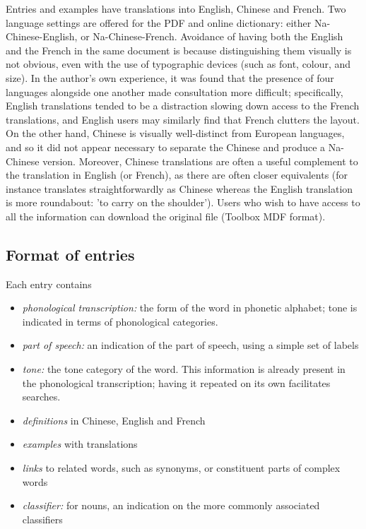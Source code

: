 Entries and examples have translations into English, Chinese and French. Two language settings are offered for the PDF and online dictionary: either Na-Chinese-English, or Na-Chinese-French. Avoidance of having both the English and the French in the same document is because distinguishing them visually is not obvious, even with the use of typographic devices (such as font, colour, and size). In the author's own experience, it was found that the presence of four languages alongside one another made consultation more difficult; specifically, English translations tended to be a distraction slowing down access to the French translations, and English users may similarly find that French clutters the layout. On the other hand, Chinese is visually well-distinct from European languages, and so it did not appear necessary to separate the Chinese and produce a Na-Chinese version. Moreover, Chinese translations are often a useful complement to the translation in English (or French), as there are often closer equivalents (for instance  translates straightforwardly as Chinese  whereas the English translation is more roundabout: 'to carry on the shoulder'). Users who wish to have access to all the information can download the original file (Toolbox MDF format). 

	\subsection{Format of entries} \label{sec:entries}

Each entry contains
\begin{itemize}
	\item \textit{phonological transcription:} the form of the word in phonetic alphabet; tone is indicated in terms of phonological categories. 
	\item \textit{part of speech:} an indication of the part of speech, using a simple set of labels
	\item \textit{tone:} the tone category of the word. This information is already present in the phonological transcription; having it repeated on its own facilitates searches.
	\item \textit{definitions} in Chinese, English and French
	\item \textit{examples} with translations
	\item \textit{links} to related words, such as synonyms, or constituent parts of complex words 
	\item \textit{classifier:} for nouns, an indication on the more commonly associated classifiers
\end{itemize}

